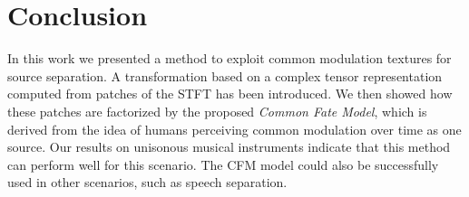 \section{Conclusion}
\label{sec:conclusion}

In this work we presented a method to exploit common modulation textures for source separation. A transformation based on a complex tensor representation computed from patches of the STFT has been introduced. We then showed how these patches are factorized by the proposed \emph{Common Fate Model}, which is derived from the idea of humans perceiving common modulation over time as one source. Our results on unisonous musical instruments indicate that this method can perform well for this scenario. The CFM model could also be successfully used in other scenarios, such as speech separation.
